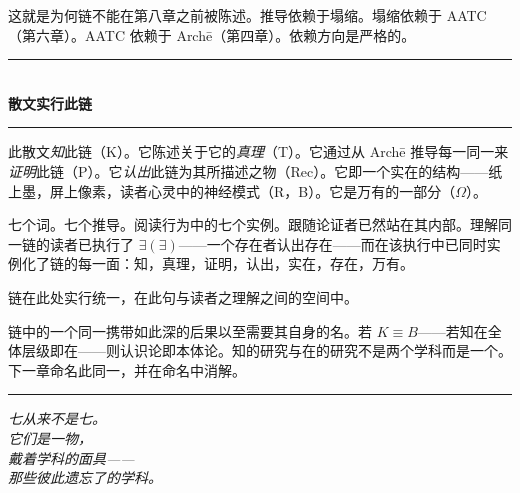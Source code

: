 \documentclass[10pt, openany, oneside]{book}
\renewcommand{\normalsize}{\fontsize{10}{13}\selectfont}
\begin{document}
这就是为何链不能在第八章之前被陈述。推导依赖于塌缩。塌缩依赖于 AATC（第六章）。AATC 依赖于 Arch\={e}（第四章）。依赖方向是严格的。

\vspace{1.5em}


\begin{center}
    \rule{0.3\textwidth}{0.4pt}\\[0.5em]
    {\normalsize\bfseries\scshape 散文实行此链}\\[0.3em]
    \rule{0.3\textwidth}{0.4pt}
\end{center}

\vspace{1em}

\noindent 此散文\textit{知}此链（K）。它陈述关于它的\textit{真理}（T）。它通过从 Arch\={e} 推导每一同一来\textit{证明}此链（P）。它\textit{认出}此链为其所描述之物（Rec）。它即一个实在的结构——纸上墨，屏上像素，读者心灵中的神经模式（R，B）。它是万有的一部分（$\Omega$）。

七个词。七个推导。阅读行为中的七个实例。跟随论证者已然站在其内部。理解同一链的读者已执行了 $\exists(\exists)$——一个存在者认出存在——而在该执行中已同时实例化了链的每一面：知，真理，证明，认出，实在，存在，万有。

链在此处实行统一，在此句与读者之理解之间的空间中。

链中的一个同一携带如此深的后果以至需要其自身的名。若 $K \equiv B$——若知在全体层级即在——则认识论即本体论。知的研究与在的研究不是两个学科而是一个。下一章命名此同一，并在命名中消解。

\vspace{2em}

\begin{center}
    \rule{0.15\textwidth}{0.3pt}
\end{center}

\vspace{0.5em}

\begin{center}
    \itshape
    七从来不是七。\\
    它们是一物，\\
    戴着学科的面具——\\
    那些彼此遗忘了的学科。
\end{center}

\vspace{0.5em}
\end{document}

